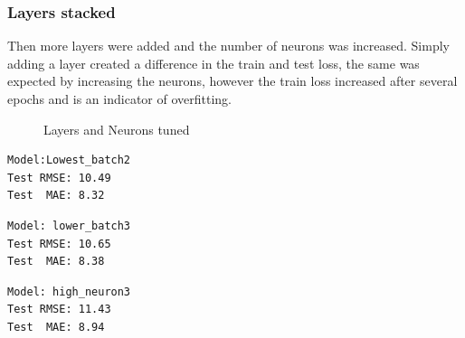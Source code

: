 ﻿\documentclass[10pt,11pt,12pt,oneside]{book}
\begin{document}
\subsubsection{Layers stacked}
Then more layers were added and the number of neurons was increased. Simply adding a layer created a difference in the train and test loss, the same was expected by increasing the neurons, however the train loss increased after several epochs and is an indicator of overfitting.\\
\begin{figure}[H]
    \centering
    \qquad
    \caption{Layers and Neurons tuned}%
    \label{fig:layers}%
\end{figure}
\begin{multicols}{3}
\centering
\begin{verbatim}
Model:Lowest_batch2
Test RMSE: 10.49
Test  MAE: 8.32
\end{verbatim}
\begin{verbatim}
Model: lower_batch3
Test RMSE: 10.65
Test  MAE: 8.38
\end{verbatim}
\begin{verbatim}
Model: high_neuron3
Test RMSE: 11.43
Test  MAE: 8.94
\end{verbatim}
\end{multicols}
\end{document}
